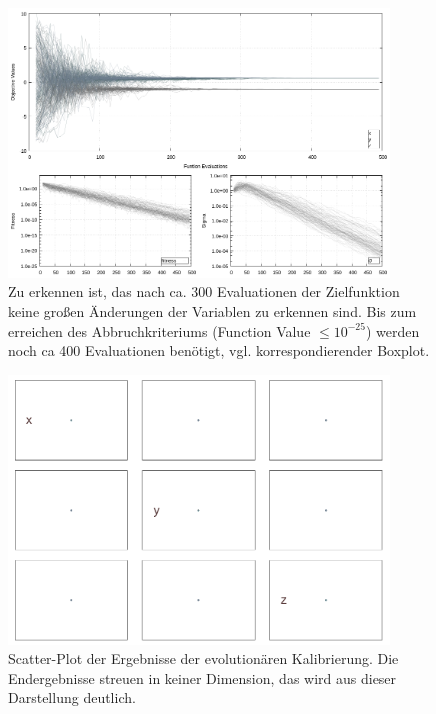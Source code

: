 %
%
\begin{figure}[!ht]
  \begin{center}
    \includegraphics[width=0.9\textwidth]{img/calibration/calibration_ant0-lines.png}
  \end{center}
  \caption {Zu erkennen ist, das nach ca. 300 Evaluationen der Zielfunktion keine großen Änderungen der Variablen zu erkennen sind. Bis zum erreichen des Abbruchkriteriums (Function Value $\leq10^{-25}$) werden noch ca 400 Evaluationen benötigt, vgl. korrespondierender Boxplot.}
  \label{fig:Final_Calibration_Ant0_ES-Lines}  
%  
\end{figure}
%
\begin{figure}[!ht]
  \begin{center}
    \includegraphics[width=0.9\textwidth]{img/calibration/calibration_ant0-scatter.png}
  \end{center}
  \caption {Scatter-Plot der Ergebnisse der evolutionären Kalibrierung. Die Endergebnisse streuen in keiner Dimension, das wird aus dieser Darstellung deutlich.}
  \label{fig:Final_Calibration_Ant0_ES-Scatter}  
%  
\end{figure}
